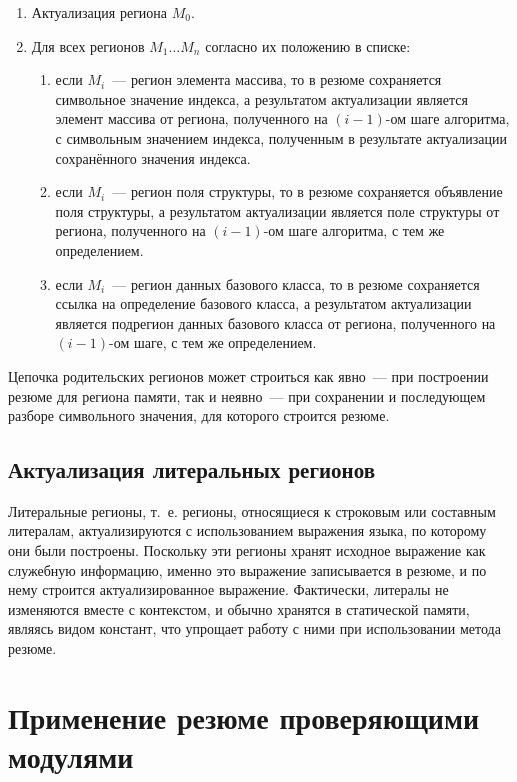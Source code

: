 \begin{enumerate}
 \item Актуализация региона $M_0$.
 \item Для всех регионов $M_1 \ldots M_n$ согласно их положению в списке:
 \begin{enumerate}
  \item если $M_i$~--- регион элемента массива, то в резюме сохраняется символьное значение индекса, а результатом актуализации является элемент массива от региона, полученного на $(i-1)$-ом шаге алгоритма, с символьным значением индекса, полученным в результате актуализации сохранённого значения индекса.
  \item если $M_i$~--- регион поля структуры, то в резюме сохраняется объявление поля структуры, а результатом актуализации является поле структуры от региона, полученного на $(i-1)$-ом шаге алгоритма, с тем же определением.
  \item если $M_i$~--- регион данных базового класса, то в резюме сохраняется ссылка на определение базового класса, а результатом актуализации является подрегион данных базового класса от региона, полученного на $(i-1)$-ом шаге, с тем же определением.
 \end{enumerate}
\end{enumerate}

Цепочка родительских регионов может строиться как явно~--- при построении резюме для региона памяти, так и неявно~--- при сохранении и последующем разборе символьного значения, для которого строится резюме.

\subsection{Актуализация литеральных регионов}

Литеральные регионы, т.~е. регионы, относящиеся к строковым или составным литералам, актуализируются с использованием выражения языка, по которому они были построены. Поскольку эти регионы хранят исходное выражение как служебную информацию, именно это выражение записывается в резюме, и по нему строится актуализированное выражение. Фактически, литералы не изменяются вместе с контекстом, и обычно хранятся в статической памяти, являясь видом констант, что упрощает работу с ними при использовании метода резюме.

\section{Применение резюме проверяющими модулями}

